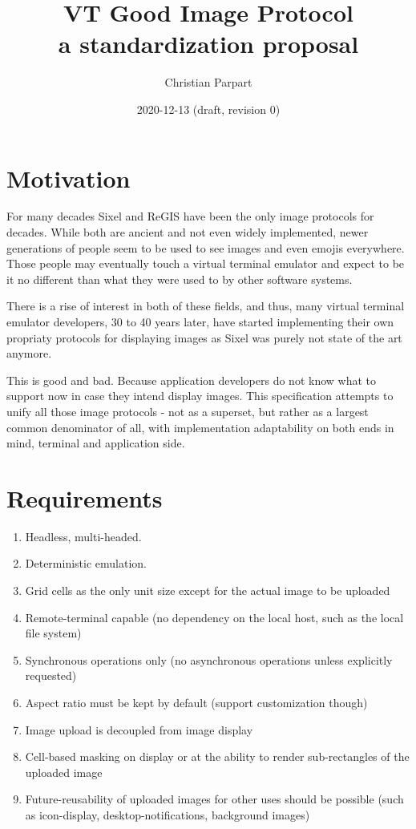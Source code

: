 \documentclass{article}
\title{VT Good Image Protocol \\
a standardization proposal}
\author{Christian Parpart}
\date{2020-12-13 (draft, revision 0)}
\begin{document}
\maketitle

\tableofcontents


\section{Motivation} %

For many decades Sixel and ReGIS have been the only image protocols for decades. While both are
ancient and not even widely implemented, newer generations of people seem to be used to see images
and even emojis everywhere. Those people may eventually touch a virtual terminal emulator
and expect to be it no different than what they were used to by other software systems.

There is a rise of interest in both of these fields, and thus, many virtual terminal emulator
developers, 30 to 40 years later, have started implementing their own propriaty protocols
for displaying images as Sixel was purely not state of the art anymore.

This is good and bad. Because application developers do not know what to support now in case they
intend display images. This specification attempts to unify all those image protocols - not
as a superset, but rather as a largest common denominator of all, with implementation adaptability
on both ends in mind, terminal and application side.

\section{Requirements} %

\begin{enumerate}
    \item Headless, multi-headed.
    \item Deterministic emulation.
    \item Grid cells as the only unit size except for the actual image to be uploaded
    \item Remote-terminal capable (no dependency on the local host, such as the local file system)
    \item Synchronous operations only (no asynchronous operations unless explicitly requested)
    \item Aspect ratio must be kept by default (support customization though)
    \item Image upload is decoupled from image display
    \item Cell-based masking on display or at the ability to render sub-rectangles of the uploaded image
    \item Future-reusability of uploaded images for other uses should be possible (such as
        icon-display, desktop-notifications, background images)
\end{enumerate}
\end{document}
